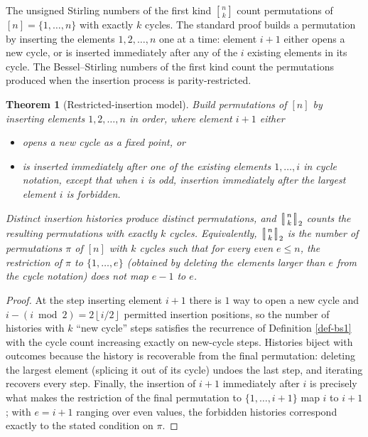 \documentclass[a4paper]{amsart}
\numberwithin{equation}{section}
\newcommand{\Stirlingone}[0]{\genfrac[]{0pt}{}}
\newcommand{\mStirlingone}[2]{\left[\mkern-3.8mu\middle|\genfrac{}{}{0pt}{}{#1}{#2}\middle|\mkern-3.8mu\right]}
\newcommand{\floor}[1]{\left\lfloor #1 \right\rfloor}
\newtheorem{theorem}{Theorem}[section]
\begin{document}
The unsigned Stirling numbers of the first kind $\Stirlingone{n}{k}$ count permutations of $[n] = \{1, \ldots, n\}$ with exactly $k$ cycles. The standard proof builds a permutation by inserting the elements $1, 2, \ldots, n$ one at a time: element $i+1$ either opens a new cycle, or is inserted immediately after any of the $i$ existing elements in its cycle. The Bessel--Stirling numbers of the first kind count the permutations produced when the insertion process is parity-restricted.

\begin{theorem}[Restricted-insertion model]\label{thm-insertion-model}
Build permutations of $[n]$ by inserting elements $1, 2, \ldots, n$ in order, where element $i+1$ either
\begin{itemize}
    \renewcommand\labelitemi{--}
    \item opens a new cycle as a fixed point, or
    \item is inserted immediately after one of the existing elements $1, \ldots, i$ in cycle notation, \emph{except} that when $i$ is odd, insertion immediately after the largest element $i$ is forbidden.
\end{itemize}
Distinct insertion histories produce distinct permutations, and $\mStirlingone{n}{k}_2$ counts the resulting permutations with exactly $k$ cycles. Equivalently, $\mStirlingone{n}{k}_2$ is the number of permutations $\pi$ of $[n]$ with $k$ cycles such that for every even $e \leq n$, the restriction of $\pi$ to $\{1, \ldots, e\}$ (obtained by deleting the elements larger than $e$ from the cycle notation) does not map $e - 1$ to $e$.
\end{theorem}

\begin{proof}
At the step inserting element $i+1$ there is $1$ way to open a new cycle and $i - (i \bmod 2) = 2\floor{i/2}$ permitted insertion positions, so the number of histories with $k$ ``new cycle'' steps satisfies the recurrence of Definition \ref{def-bs1} with the cycle count increasing exactly on new-cycle steps. Histories biject with outcomes because the history is recoverable from the final permutation: deleting the largest element (splicing it out of its cycle) undoes the last step, and iterating recovers every step. Finally, the insertion of $i+1$ immediately after $i$ is precisely what makes the restriction of the final permutation to $\{1,\ldots,i+1\}$ map $i$ to $i+1$; with $e = i + 1$ ranging over even values, the forbidden histories correspond exactly to the stated condition on $\pi$.
\end{proof}
\end{document}
